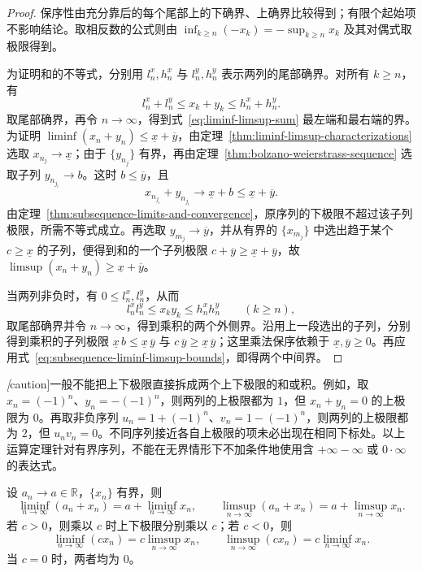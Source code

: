 \documentclass[UTF8,12pt,a4paper,fontset=fandol]{ctexbook}
\begin{document}
\begin{proof}
保序性由充分靠后的每个尾部上的下确界、上确界比较得到；有限个起始项不影响结论。取相反数的公式则由 $\inf_{k\geq n}(-x_k)=-\sup_{k\geq n}x_k$ 及其对偶式取极限得到。

为证明和的不等式，分别用 $l_n^x,h_n^x$ 与 $l_n^y,h_n^y$ 表示两列的尾部确界。对所有 $k\geq n$，有
\[
    l_n^x+l_n^y\leq x_k+y_k\leq h_n^x+h_n^y.
\]
取尾部确界，再令 $n\to\infty$，得到式~\eqref{eq:liminf-limsup-sum} 最左端和最右端的界。为证明 $\liminf(x_n+y_n)\leq\underline x+\overline y$，由定理~\ref{thm:liminf-limsup-characterizations} 选取 $x_{n_j}\to\underline x$；由于 $\{y_{n_j}\}$ 有界，再由定理~\ref{thm:bolzano-weierstrass-sequence} 选取子列 $y_{n_{j_i}}\to b$。这时 $b\leq\overline y$，且
\[
    x_{n_{j_i}}+y_{n_{j_i}}\longrightarrow\underline x+b
    \leq\underline x+\overline y.
\]
由定理~\ref{thm:subsequence-limits-and-convergence}，原序列的下极限不超过该子列极限，所需不等式成立。再选取 $y_{m_j}\to\overline y$，并从有界的 $\{x_{m_j}\}$ 中选出趋于某个 $c\geq\underline x$ 的子列，便得到和的一个子列极限 $c+\overline y\geq\underline x+\overline y$，故 $\limsup(x_n+y_n)\geq\underline x+\overline y$。

当两列非负时，有 $0\leq l_n^x,l_n^y$，从而
\[
    l_n^x l_n^y\leq x_k y_k\leq h_n^x h_n^y
    \qquad(k\geq n),
\]
取尾部确界并令 $n\to\infty$，得到乘积的两个外侧界。沿用上一段选出的子列，分别得到乘积的子列极限 $\underline x\,b\leq\underline x\,\overline y$ 与 $c\,\overline y\geq\underline x\,\overline y$；这里乘法保序依赖于 $\underline x,\overline y\geq0$。再应用式~\eqref{eq:subsequence-liminf-limsup-bounds}，即得两个中间界。
\end{proof}

\emph[caution]{一般不能把上下极限直接拆成两个上下极限的和或积。}例如，取 $x_n=(-1)^n$、$y_n=-(-1)^n$，则两列的上极限都为 $1$，但 $x_n+y_n=0$ 的上极限为 $0$。再取非负序列 $u_n=1+(-1)^n$、$v_n=1-(-1)^n$，则两列的上极限都为 $2$，但 $u_nv_n=0$。不同序列接近各自上极限的项未必出现在相同下标处。以上运算定理针对有界序列，不能在无界情形下不加条件地使用含 $+\infty-\infty$ 或 $0\cdot\infty$ 的表达式。

\begin{corollary}[收敛项与常数因子]
\label{cor:liminf-limsup-affine-rules}
设 $a_n\to a\in\mathbb{R}$，$\{x_n\}$ 有界，则
\[
    \liminf_{n\to\infty}(a_n+x_n)=a+\liminf_{n\to\infty}x_n,
    \qquad
    \limsup_{n\to\infty}(a_n+x_n)=a+\limsup_{n\to\infty}x_n.
\]
若 $c>0$，则乘以 $c$ 时上下极限分别乘以 $c$；若 $c<0$，则
\[
    \liminf_{n\to\infty}(cx_n)=c\limsup_{n\to\infty}x_n,
    \qquad
    \limsup_{n\to\infty}(cx_n)=c\liminf_{n\to\infty}x_n.
\]
当 $c=0$ 时，两者均为 $0$。
\end{corollary}
\end{document}
